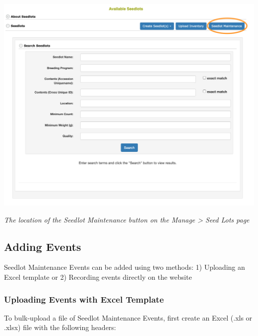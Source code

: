 \documentclass[
  12pt,
]{book}
\begin{document}
\begin{center}\includegraphics[width=0.95\linewidth]{assets/images/manage_seedlots_seedlot_maintenance} \end{center}

\emph{The location of the Seedlot Maintenance button on the Manage \textgreater{} Seed Lots page}

\hypertarget{adding-events}{%
\subsection{Adding Events}\label{adding-events}}

Seedlot Maintenance Events can be added using two methods: 1) Uploading an Excel template or 2) Recording events directly on the website

\hypertarget{uploading-events-with-excel-template}{%
\subsubsection*{Uploading Events with Excel Template}\label{uploading-events-with-excel-template}}


To bulk-upload a file of Seedlot Maintenance Events, first create an Excel (.xls or .xlsx) file with the following headers:
\end{document}
